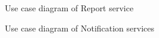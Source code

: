 \documentclass[12pt]{article}
\begin{document}
\begin{figure}[H]
\centering	
{}
\caption{Use case diagram of Report service}
\end{figure}

\begin{figure}[H]
\centering	
{}
\caption{Use case diagram of Notification services}
\end{figure}
\end{document}
